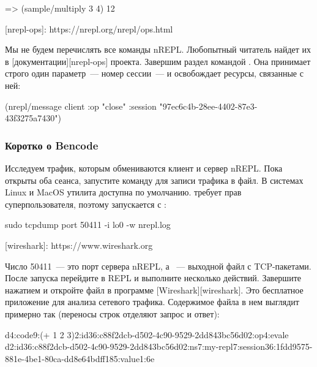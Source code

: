 \begin{english}
  \begin{clojure}
=> (sample/multiply 3 4)
12
  \end{clojure}
\end{english}

[nrepl-ops]: https://nrepl.org/nrepl/ops.html

Мы не будем перечислять все команды nREPL. Любопытный читатель найдет их в [документации][nrepl-ops] проекта. Завершим раздел командой . Она принимает строго один параметр~--- номер сессии~--- и освобождает ресурсы, связанные с ней:

\begin{english}
  \begin{clojure}
(nrepl/message client
               {:op "close"
                :session "97ec6c4b-28ee-4402-87e3-43f3275a7430"})
  \end{clojure}
\end{english}

\subsubsection{Коротко о Bencode}

Исследуем трафик, которым обмениваются клиент и сервер nREPL. Пока открыты оба сеанса, запустите команду  для записи трафика в файл. В системах Linux и MacOS утилита доступна по умолчанию.  требует прав суперпользователя, поэтому запускается с :

\begin{english}
  \begin{clojure}
sudo tcpdump port 50411 -i lo0 -w nrepl.log
  \end{clojure}
\end{english}

[wireshark]: https://www.wireshark.org

Число 50411~--- это порт сервера nREPL, а ~--- выходной файл с TCP-пакетами. После запуска  перейдите в REPL и выполните несколько действий. Завершите  нажатием  и откройте файл в программе [Wireshark][wireshark]. Это бесплатное приложение для анализа сетевого трафика. Содержимое файла в нем выглядит примерно так (переносы строк отделяют запрос и ответ):

\begin{english}
  \begin{text}
d4:code9:(+ 1 2 3)2:id36:c88f2dcb-d502-4c90-9529-2dd843bc56d02:op4:evale
d2:id36:c88f2dcb-d502-4c90-9529-2dd843bc56d02:ns7:my-repl7:session36:1fdd9575-881e-4be1-80ca-dd8e64bdff185:value1:6e
  \end{text}
\end{english}

